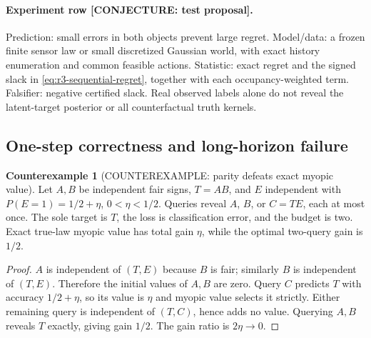 \documentclass[11pt]{article}
\theoremstyle{definition}
\newtheorem{counterexample}[theorem]{Counterexample}
\theoremstyle{remark}
\begin{document}
\paragraph{Experiment row [CONJECTURE: test proposal].}
Prediction: small errors in both objects prevent large regret.
Model/data: a frozen finite sensor law or small discretized Gaussian world,
with exact history enumeration and common feasible actions.
Statistic: exact regret and the signed slack in
\eqref{eq:r3-sequential-regret}, together with each occupancy-weighted term.
Falsifier: negative certified slack.  Real observed labels alone do not
reveal the latent-target posterior or all counterfactual truth kernels.

\subsection{One-step correctness and long-horizon failure}

\begin{counterexample}[COUNTEREXAMPLE: parity defeats exact myopic value]
Let $A,B$ be independent fair signs, $T=AB$, and $E$ independent with
$P(E=1)=1/2+\eta$, $0<\eta<1/2$.  Queries reveal $A$, $B$, or $C=TE$,
each at most once.  The sole target is $T$, the loss is classification
error, and the budget is two.  Exact true-law myopic value has total gain
$\eta$, while the optimal two-query gain is $1/2$.
\end{counterexample}
\begin{proof}
$A$ is independent of $(T,E)$ because $B$ is fair; similarly $B$ is
independent of $(T,E)$.  Therefore the initial values of $A,B$ are zero.
Query $C$ predicts $T$ with accuracy $1/2+\eta$, so its value is $\eta$
and myopic value selects it strictly.  Either remaining query is
independent of $(T,C)$, hence adds no value.  Querying $A,B$ reveals $T$
exactly, giving gain $1/2$.  The gain ratio is $2\eta\to0$.
\end{proof}
\end{document}
